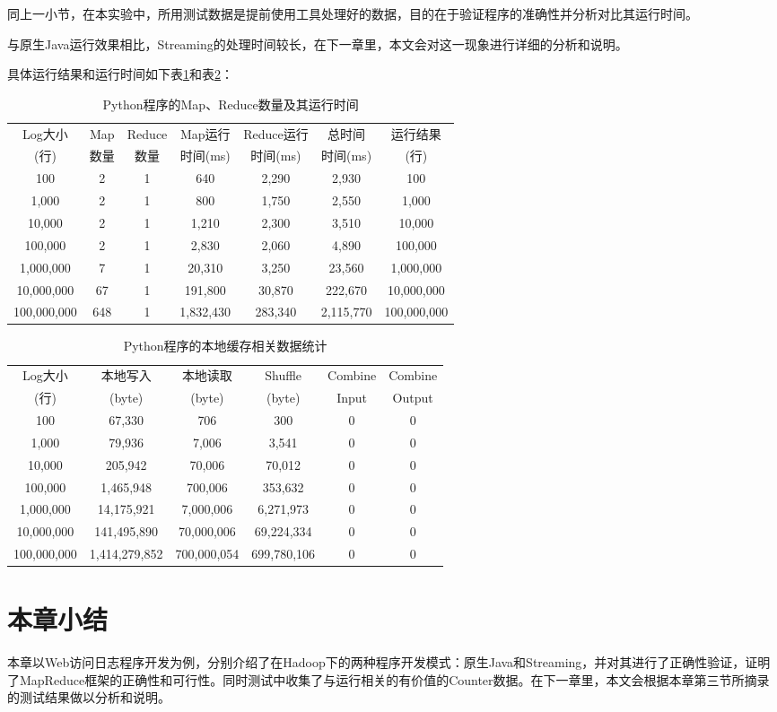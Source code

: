 同上一小节，在本实验中，所用测试数据是提前使用工具处理好的数据，目的在于验证程序的准确性并分析对比其运行时间。

与原生Java运行效果相比，Streaming的处理时间较长，在下一章里，本文会对这一现象进行详细的分析和说明。

具体运行结果和运行时间如下表\ref{tab:python1}和表\ref{tab:python2}：

\begin{table}[htbp]
 \caption{\label{tab:python1}Python程序的Map、Reduce数量及其运行时间}
 \centering
 \begin{tabular}{ccccccc}
  \toprule
  Log大小 & Map & Reduce & Map运行 & Reduce运行 & 总时间 & 运行结果\\
  (行) & 数量 & 数量 & 时间(ms) & 时间(ms) & 时间(ms) & (行)\\
  \midrule
  100 & 2 & 1 & 640 & 2,290 & 2,930 & 100\\
  1,000 & 2 & 1 & 800 & 1,750 & 2,550 & 1,000\\
  10,000 & 2 & 1 & 1,210 & 2,300 & 3,510 & 10,000\\
  100,000 & 2 & 1 & 2,830 & 2,060 & 4,890 & 100,000\\
  1,000,000 & 7 & 1 & 20,310 & 3,250 & 23,560 & 1,000,000\\
  10,000,000 & 67 & 1 & 191,800 & 30,870 & 222,670 & 10,000,000\\
  100,000,000 & 648 & 1 & 1,832,430 & 283,340 & 2,115,770 & 100,000,000\\
  \bottomrule
 \end{tabular}
\end{table}


\begin{table}[htbp]
 \caption{\label{tab:python2}Python程序的本地缓存相关数据统计}
 \centering
 \begin{tabular}{cccccc}
  \toprule
  Log大小 & 本地写入 & 本地读取 & Shuffle & Combine & Combine\\
  (行) & (byte) & (byte) & (byte) &  Input & Output\\
  \midrule
  100 & 67,330 & 706 & 300 & 0 & 0\\
  1,000 & 79,936 & 7,006 & 3,541 & 0 & 0\\
  10,000 & 205,942 & 70,006 & 70,012 & 0 & 0\\
  100,000 & 1,465,948 & 700,006 & 353,632 & 0 & 0\\
  1,000,000 & 14,175,921 & 7,000,006 & 6,271,973 & 0 & 0\\
  10,000,000 & 141,495,890 & 70,000,006 & 69,224,334 & 0 & 0\\
  100,000,000 & 1,414,279,852 & 700,000,054 & 699,780,106 & 0 & 0\\
  \bottomrule
 \end{tabular}
\end{table}

\section{本章小结}
本章以Web访问日志程序开发为例，分别介绍了在Hadoop下的两种程序开发模式：原生Java和Streaming，并对其进行了正确性验证，证明了MapReduce框架的正确性和可行性。同时测试中收集了与运行相关的有价值的Counter数据。在下一章里，本文会根据本章第三节所摘录的测试结果做以分析和说明。